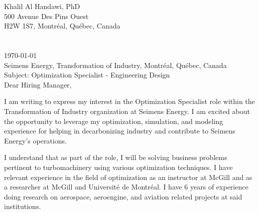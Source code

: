 \documentclass[12pt]{article} %
\begin{document}

Khalil Al Handawi, PhD\\
500 Avenue Des Pins Ouest\\
H2W 1S7, Montr\'{e}al, Qu\'{e}bec, Canada\\
\faPhone~~\cvnumberphone\\
\faEnvelope~~\href{mailto:\cvmail}{\cvmail}\\

\today\\

Seimens Energy, Transformation of Industry, Montr\'{e}al, Qu\'{e}bec, Canada\\
Subject: Optimization Specialist - Engineering Design\\[6pt]


Dear Hiring Manager,

\medskip %

I am writing to express my interest in the Optimization Specialist role within the Transformation of Industry organization at Seimens Energy. I am excited about the opportunity to leverage my optimization, simulation, and modeling experience for helping in decarbonizing industry and contribute to Seimens Energy's operations.

\medskip %

I understand that as part of the role, I will be solving business problems pertinent to turbomachinery using various optimization techniques. I have relevant experience in the field of optimization as an instructor at McGill and as a researcher at McGill and Universit\'{e} de Montr\'{e}al. I have 6 years of experience doing research on aerospace, aeroengine, and aviation related projects at said institutions.

\medskip %
\end{document}
